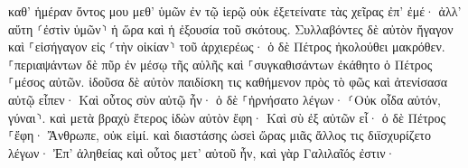 \documentclass{openreader}
\begin{document}
καθ’ ἡμέραν ὄντος μου μεθ’ ὑμῶν ἐν τῷ ἱερῷ οὐκ ἐξετείνατε τὰς χεῖρας ἐπ’ ἐμέ· ἀλλ’ αὕτη ⸂ἐστὶν ὑμῶν⸃ ἡ ὥρα καὶ ἡ ἐξουσία τοῦ σκότους. 
Συλλαβόντες δὲ αὐτὸν ἤγαγον καὶ ⸀εἰσήγαγον εἰς ⸂τὴν οἰκίαν⸃ τοῦ ἀρχιερέως· ὁ δὲ Πέτρος ἠκολούθει μακρόθεν. 
⸀περιαψάντων δὲ πῦρ ἐν μέσῳ τῆς αὐλῆς καὶ ⸀συγκαθισάντων ἐκάθητο ὁ Πέτρος ⸀μέσος αὐτῶν. 
ἰδοῦσα δὲ αὐτὸν παιδίσκη τις καθήμενον πρὸς τὸ φῶς καὶ ἀτενίσασα αὐτῷ εἶπεν· Καὶ οὗτος σὺν αὐτῷ ἦν· 
ὁ δὲ ⸀ἠρνήσατο λέγων· ⸂Οὐκ οἶδα αὐτόν, γύναι⸃. 
καὶ μετὰ βραχὺ ἕτερος ἰδὼν αὐτὸν ἔφη· Καὶ σὺ ἐξ αὐτῶν εἶ· ὁ δὲ Πέτρος ⸀ἔφη· Ἄνθρωπε, οὐκ εἰμί. 
καὶ διαστάσης ὡσεὶ ὥρας μιᾶς ἄλλος τις διϊσχυρίζετο λέγων· Ἐπ’ ἀληθείας καὶ οὗτος μετ’ αὐτοῦ ἦν, καὶ γὰρ Γαλιλαῖός ἐστιν· 
\end{document}
